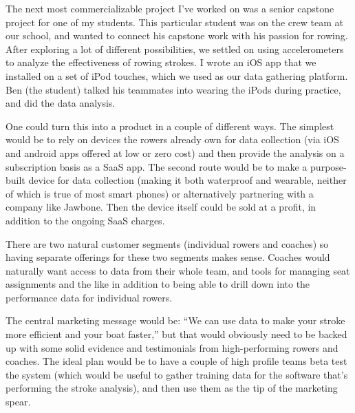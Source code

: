 \documentclass{article}
\begin{document}
The next most commercializable project I've worked on was a senior capstone project for one of my students. This particular student was on the crew team at our school, and wanted to connect his capstone work with his passion for rowing. After exploring a lot of different possibilities, we settled on using accelerometers to analyze the effectiveness of rowing strokes. I wrote an iOS app that we installed on a set of iPod touches, which we used as our data gathering platform. Ben (the student) talked his teammates into wearing the iPods during practice, and did the data analysis.

One could turn this into a product in a couple of different ways. The simplest would be to rely on devices the rowers already own for data collection (via iOS and android apps offered at low or zero cost) and then provide the analysis on a subscription basis as a SaaS app.  The second route would be to make a purpose-built device for data collection (making it both waterproof and wearable, neither of which is true of most smart phones) or alternatively partnering with a company like Jawbone. Then the device itself could be sold at a profit, in addition to the ongoing SaaS charges.

There are two natural customer segments (individual rowers and coaches) so having separate offerings for these two segments makes sense.  Coaches would naturally want access to data from their whole team, and tools for managing seat assignments and the like in addition to being able to drill down into the performance data for individual rowers. 

The central marketing message would be: ``We can use data to make your stroke more efficient and your boat faster,'' but that would obviously need to be backed up with some solid evidence and testimonials from high-performing rowers and coaches.  The ideal plan would be to have a couple of high profile teams beta test the system (which would be useful to gather training data for the software that's performing the stroke analysis), and then use them as the tip of the marketing spear.
\end{document}
